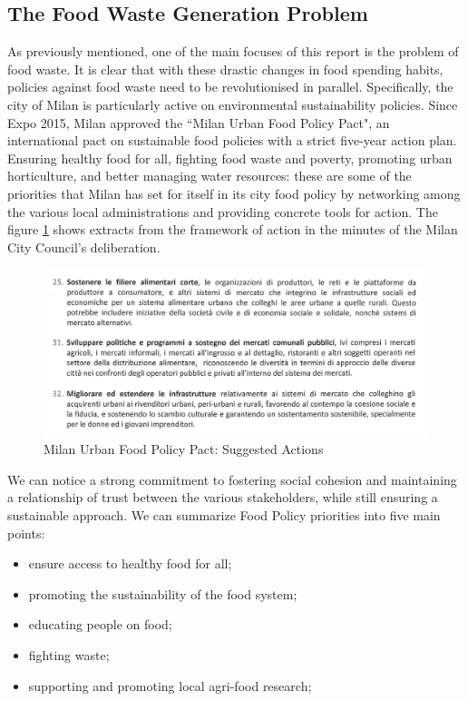 \subsection{The Food Waste Generation Problem}

As previously mentioned, one of the main focuses of this report is the problem of food waste.
It is clear that with these drastic changes in food spending habits, policies against food waste need to be revolutionised in parallel.
Specifically, the city of Milan is particularly active on environmental sustainability policies.
Since Expo 2015, Milan approved the ``Milan Urban Food Policy Pact", an international pact on sustainable food policies with a strict five-year action plan. Ensuring healthy food for all, fighting food waste and poverty, promoting urban horticulture, and better managing water resources: these are some of the priorities that Milan has set for itself in its city food policy by networking among the various local administrations and providing concrete tools for action. The figure \ref{fig: policy} shows extracts from the framework of action in the minutes of the Milan City Council's deliberation.

\begin{figure}[h!]
  \centering
  \includegraphics[width=14cm]{figs/food policy.png}
  \caption{Milan Urban Food Policy Pact: Suggested Actions}
  \label{fig: policy}
\end{figure}

We can notice a strong commitment to fostering social cohesion and maintaining a relationship of trust between the various stakeholders, while still ensuring a sustainable approach. We can summarize Food Policy priorities into five main points:

\begin{itemize}
\item ensure access to healthy food for all;
\item promoting the sustainability of the food system;
\item educating people on food;
\item fighting waste;
\item supporting and promoting local agri-food research;
\end{itemize}

